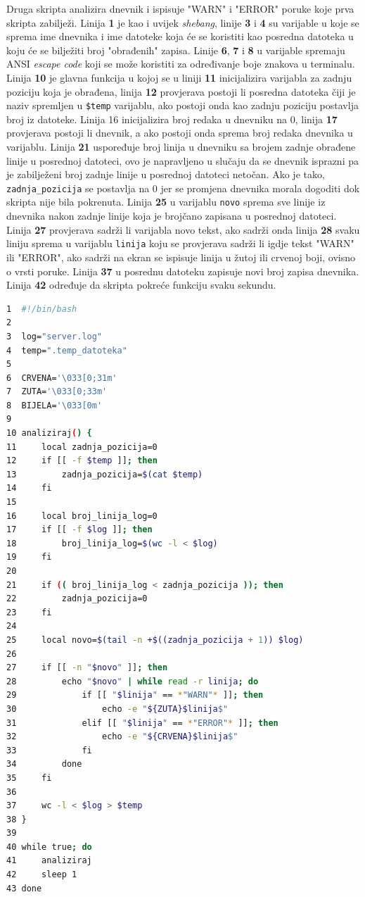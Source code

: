 \documentclass{foi}
\begin{document}
Druga skripta analizira dnevnik i ispisuje "WARN" i "ERROR" poruke koje prva skripta zabilježi. Linija \textbf{1} je kao i uvijek \textit{shebang}, linije \textbf{3} i \textbf{4} su varijable u koje se sprema ime dnevnika i ime datoteke koja će se koristiti kao posredna datoteka u koju će se bilježiti broj "obrađenih" zapisa. Linije \textbf{6}, \textbf{7} i \textbf{8} u varijable spremaju ANSI \textit{escape code} koji se može koristiti za određivanje boje znakova u terminalu. Linija \textbf{10} je glavna funkcija u kojoj se u liniji \textbf{11} inicijalizira varijabla za zadnju poziciju koja je obrađena, linija \textbf{12} provjerava postoji li posredna datoteka čiji je naziv spremljen u \verb|$temp| varijablu, ako postoji onda kao zadnju poziciju postavlja broj iz datoteke.
Linija {16} inicijalizira broj redaka u dnevniku na 0, linija \textbf{17} provjerava postoji li dnevnik, a ako postoji onda sprema broj redaka dnevnika u varijablu. Linija \textbf{21} uspoređuje broj linija u dnevniku sa brojem zadnje obrađene linije u posrednoj datoteci, ovo je napravljeno u slučaju da se dnevnik isprazni pa je zabilježeni broj zadnje linije u posrednoj datoteci netočan. Ako je tako, \verb|zadnja_pozicija| se postavlja na 0 jer se promjena dnevnika morala dogoditi dok skripta nije bila pokrenuta. Linija \textbf{25} u varijablu \verb|novo| sprema sve linije iz dnevnika nakon zadnje linije koja je brojčano zapisana u posrednoj datoteci. Linija \textbf{27} provjerava sadrži li varijabla novo tekst, ako sadrži onda linija \textbf{28} svaku liniju sprema u varijablu \verb|linija| koju se provjerava sadrži li igdje tekst "WARN" ili "ERROR", ako sadrži na ekran se ispisuje linija u žutoj ili crvenoj boji, ovisno o vrsti poruke. Linija \textbf{37} u posrednu datoteku zapisuje novi broj zapisa dnevnika. Linija \textbf{42} određuje da skripta pokreće funkciju svaku sekundu.

\begin{lstlisting}[language=bash]
1  #!/bin/bash
2  
3  log="server.log"
4  temp=".temp_datoteka"
5  
6  CRVENA='\033[0;31m'
7  ZUTA='\033[0;33m'
8  BIJELA='\033[0m'
9  
10 analiziraj() {
11     local zadnja_pozicija=0
12     if [[ -f $temp ]]; then
13         zadnja_pozicija=$(cat $temp)
14     fi
15 
16     local broj_linija_log=0
17     if [[ -f $log ]]; then
18         broj_linija_log=$(wc -l < $log)
19     fi
20 
21     if (( broj_linija_log < zadnja_pozicija )); then
22         zadnja_pozicija=0
23     fi
24 
25     local novo=$(tail -n +$((zadnja_pozicija + 1)) $log)
26 
27     if [[ -n "$novo" ]]; then
28         echo "$novo" | while read -r linija; do
29             if [[ "$linija" == *"WARN"* ]]; then
30                 echo -e "${ZUTA}$linija$"
31             elif [[ "$linija" == *"ERROR"* ]]; then
32                 echo -e "${CRVENA}$linija$"
33             fi
34         done
35     fi
36 
37     wc -l < $log > $temp
38 }
39 
40 while true; do
41     analiziraj
42     sleep 1
43 done
\end{lstlisting}
\end{document}
